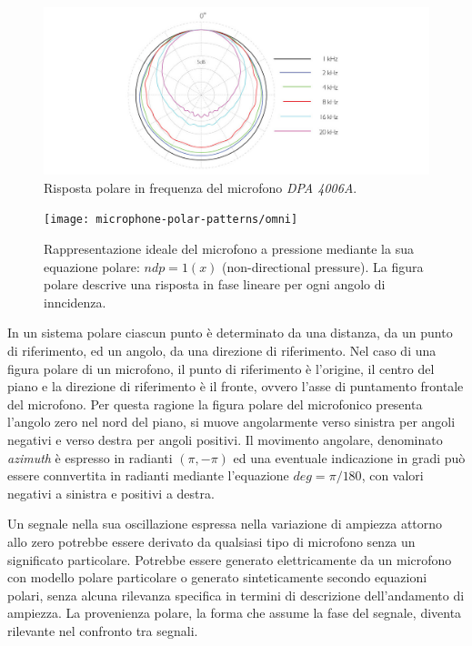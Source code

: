 \begin{refsection}
\begin{figure}[h]
\centering
\includegraphics[width=0.99\columnwidth]{CAPITOLI/0300/IMG/4006A-ddicate-4006A-Omni-Microphone-polar-pattern.jpg}
\caption[]{Risposta polare in frequenza del microfono \emph{DPA 4006A}.}%
\label{pol:dpa4006}
\end{figure}

\begin{figure}[t]
\centering
\texttt{[image: microphone-polar-patterns/omni]}
\caption[]{Rappresentazione ideale del microfono a pressione mediante la sua
equazione polare: $ndp = 1(x)$ (non-directional pressure). La figura polare
descrive una risposta in fase lineare per ogni angolo di inncidenza.}
\label{polar:omni}
\end{figure}

In un sistema polare ciascun punto è
determinato da una distanza, da un punto di riferimento, ed un angolo, da una
direzione di riferimento. Nel caso di una figura polare di un microfono, il
punto di riferimento è l'origine, il centro del piano e la direzione di
riferimento è il fronte, ovvero l'asse di puntamento frontale del microfono. Per
questa ragione la figura polare del microfonico presenta l'angolo zero
nel nord del piano, si muove angolarmente verso sinistra per angoli
negativi e verso destra per angoli positivi. Il movimento angolare, denominato
\emph{azimuth} è espresso in radianti $(\pi,-\pi)$ ed una eventuale indicazione in
gradi può essere connvertita in radianti mediante l'equazione $deg = \pi/180$,
con valori negativi a sinistra e positivi a destra.

Un segnale nella sua oscillazione espressa nella variazione di ampiezza
attorno allo zero potrebbe essere derivato da qualsiasi tipo di microfono senza
un significato particolare. Potrebbe essere generato elettricamente da un
microfono con modello polare particolare o generato sinteticamente secondo equazioni polari, senza
alcuna rilevanza specifica in termini di descrizione dell'andamento di ampiezza.
La provenienza polare, la forma che assume la fase del segnale, diventa rilevante nel confronto tra segnali.


\end{refsection}
